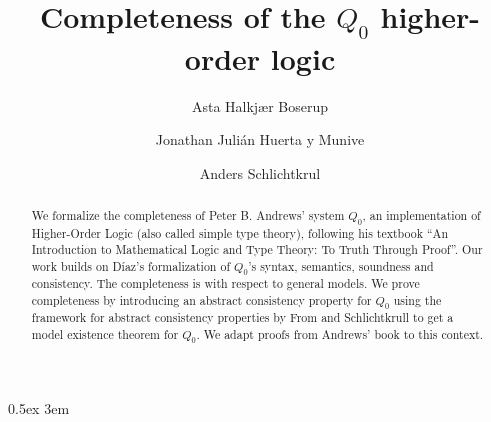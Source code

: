 \documentclass[10pt,a4paper]{article}
\begin{document}
\title{Completeness of the $Q_0$ higher-order logic}
\author{Asta Halkjær Boserup\and Jonathan Juli\'an Huerta y Munive\and Anders Schlichtkrul}
\maketitle

\begin{abstract}
  We formalize the completeness of Peter B. Andrews' system $Q_0$, an implementation of Higher-Order Logic (also called simple type theory),
  following his textbook ``An Introduction to Mathematical Logic and Type Theory: To Truth Through Proof''. 
  Our work builds on D\'iaz's formalization of $Q_0$'s syntax, semantics, soundness and consistency. 
  The completeness is with respect to general models. We prove completeness by introducing an abstract 
  consistency property for $Q_0$ using the framework for abstract consistency properties by From and 
  Schlichtkrull to get a model existence theorem for $Q_0$. We adapt proofs from Andrews' book to this context.
\end{abstract}

\tableofcontents

\parindent 0pt\parskip 0.5ex
\emergencystretch 3em
\newpage
\end{document}
